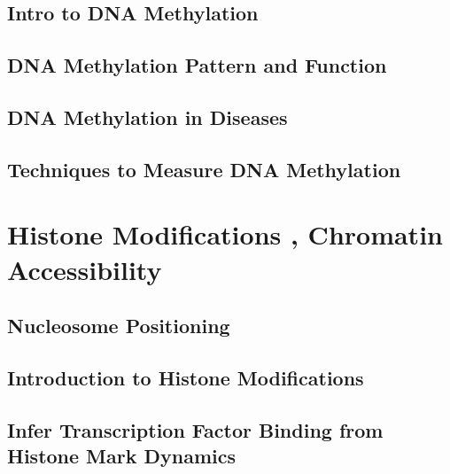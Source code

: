 \documentclass[
]{book}
\begin{document}
\hypertarget{intro-to-dna-methylation}{%
\section{Intro to DNA Methylation}\label{intro-to-dna-methylation}}

\hypertarget{dna-methylation-pattern-and-function}{%
\section{DNA Methylation Pattern and Function}\label{dna-methylation-pattern-and-function}}

\hypertarget{dna-methylation-in-diseases}{%
\section{DNA Methylation in Diseases}\label{dna-methylation-in-diseases}}

\hypertarget{techniques-to-measure-dna-methylation}{%
\section{Techniques to Measure DNA Methylation}\label{techniques-to-measure-dna-methylation}}

\hypertarget{hist}{%
\chapter{Histone Modifications , Chromatin Accessibility}\label{hist}}

\hypertarget{nucleosome-positioning}{%
\section{Nucleosome Positioning}\label{nucleosome-positioning}}

\hypertarget{introduction-to-histone-modifications}{%
\section{Introduction to Histone Modifications}\label{introduction-to-histone-modifications}}

\hypertarget{infer-transcription-factor-binding-from-histone-mark-dynamics}{%
\section{Infer Transcription Factor Binding from Histone Mark Dynamics}\label{infer-transcription-factor-binding-from-histone-mark-dynamics}}
\end{document}
